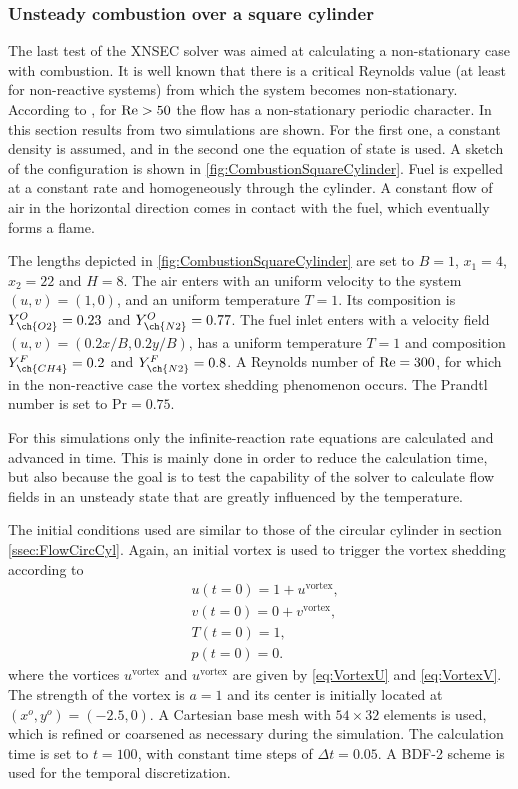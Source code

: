 \subsubsection{Unsteady combustion over a square cylinder}
The last test of the XNSEC solver was aimed at calculating a non-stationary case with combustion. It is well known that there is a critical Reynolds value (at least for non-reactive systems) from which the system becomes non-stationary. According to \textcite{sharmaHEATFLUIDFLOW2004}, for $\text{Re} > 50$ the flow has a non-stationary periodic character. In this section results from two simulations are shown. For the first one, a constant density is assumed, and in the second one the equation of state is used. 
A sketch of the configuration is shown in \cref{fig:CombustionSquareCylinder}. Fuel is expelled at a constant rate and homogeneously through the cylinder. A constant flow of air in the horizontal direction comes in contact with the fuel, which eventually forms a flame.

The lengths depicted in \cref{fig:CombustionSquareCylinder} are set to $B = 1$, $x_1 = 4$, $x_2 = 22$ and $H = 8$. The air enters with an uniform velocity to the system $(u,v) =(1,0)$, and an uniform temperature $T = 1$. Its composition is $Y^O_{\ch{O2}} = 0.23$ and $Y^O_{\ch{N2}} = 0.77$. The fuel inlet enters with a velocity field $(u,v) = (0.2x/B,0.2y/B)$, has a uniform temperature $T = 1$ and composition $Y^F_{\ch{CH4}} = 0.2$ and $Y^F_{\ch{N2}} = 0.8$. A Reynolds number of $\text{Re} = 300$, for which in the non-reactive case the vortex shedding phenomenon occurs. The Prandtl number is set to $\text{Pr} = 0.75$. 

For this simulations only the infinite-reaction rate equations are calculated and advanced in time. This is mainly done in order to reduce the calculation time, but also because the goal is to test the capability of the solver to calculate flow fields in an unsteady state that are greatly influenced by the temperature.  

The initial conditions used are similar to those of the circular cylinder in section \cref{ssec:FlowCircCyl}. Again, an initial vortex is used to trigger the vortex shedding according to
\begin{subequations} 
	\begin{align}
		&u(t=0) = 1 + u^{\text{vortex}},  \\
		&v(t=0) = 0 + v^{\text{vortex}},  \\
		&T(t=0) = 1,\\
		&p(t=0) = 0.
	\end{align}
\end{subequations}
where the vortices $u^{\text{vortex}}$ and $u^{\text{vortex}}$ are given by \cref{eq:VortexU} and \cref{eq:VortexV}. The strength of the vortex is $a=1$ and its center is initially located at $(x^o,y^o) = (-2.5, 0)$. A Cartesian base mesh with $54\times32$ elements is used, which is refined or coarsened as necessary during the simulation. The calculation time is set to $t = 100$, with constant time steps of $\Delta t = 0.05$.  A BDF-2 scheme is used for the temporal discretization.

